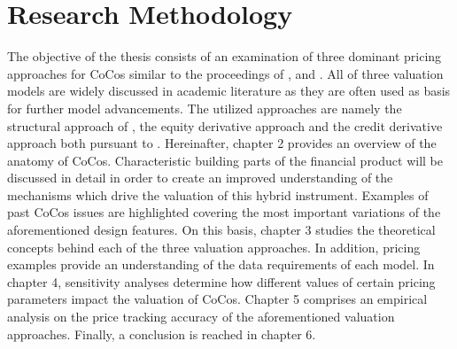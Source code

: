 \section{Research Methodology}
The objective of the thesis consists of an examination of three dominant pricing approaches for CoCos similar to the proceedings of \citet{alvemar2012modelling}, \citet{erismann2015pricing} and \citet{wilkens2014contingent}. All of three valuation models are widely discussed in academic literature as they are often used as basis for further model advancements. The utilized approaches are namely the structural approach of \citet{pennacchi2010structural}, the equity derivative approach and the credit derivative approach both pursuant to \citet{de2011pricing}. Hereinafter, chapter 2 provides an overview of the anatomy of CoCos. Characteristic building parts of the financial product will be discussed in detail in order to create an improved understanding of the mechanisms which drive the valuation of this hybrid instrument. Examples of past CoCos issues are highlighted covering the most important variations of the aforementioned design features. On this basis, chapter 3 studies the theoretical concepts behind each of the three valuation approaches. In addition, pricing examples provide an understanding of the data requirements of each model. In chapter 4, sensitivity analyses determine how different values of certain pricing parameters impact the valuation of CoCos. Chapter 5 comprises an empirical analysis on the price tracking accuracy of the aforementioned valuation approaches. Finally, a conclusion is reached in chapter 6.




